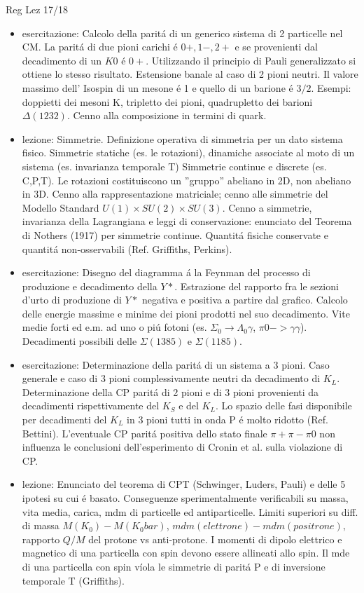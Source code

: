 \begin{frame}[allowframebreaks]{Reg Lez 17/18}
\begin{itemize}
\item esercitazione: Calcolo della parit\'a di un generico sistema di 2 particelle nel CM. La parit\'a di due pioni carichi \'e $0+,1-,2+$ e se provenienti dal decadimento di un $K0$ \'e $0+$. Utilizzando il principio di Pauli generalizzato si ottiene lo stesso risultato. Estensione banale al caso di 2 pioni neutri. Il valore massimo dell' Isospin di un mesone \'e 1 e quello di un barione \'e $3/2$. Esempi: doppietti dei mesoni K, tripletto dei pioni, quadrupletto dei barioni $\Delta(1232)$. Cenno alla composizione in termini di quark.

\item lezione: Simmetrie. Definizione operativa di simmetria per un dato sistema fisico. Simmetrie statiche (es. le rotazioni), dinamiche associate al moto di un sistema (es. invarianza temporale T) Simmetrie continue e discrete (es. C,P,T). Le rotazioni costituiscono un ''gruppo'' abeliano in 2D, non abeliano in 3D. Cenno alla rappresentazione matriciale; cenno alle simmetrie del Modello Standard $U(1)\times SU(2)\times SU(3)$. Cenno a simmetrie, invarianza della Lagrangiana e leggi di conservazione: enunciato del Teorema di N\:others (1917) per simmetrie continue. Quantit\'a fisiche conservate e quantit\'a non-osservabili (Ref. Griffiths, Perkins).

\item esercitazione: Disegno del diagramma \'a la Feynman del processo di produzione e decadimento della $Y*$. Estrazione del rapporto fra le sezioni d'urto di produzione di $Y*$ negativa e positiva a partire dal grafico. Calcolo delle energie massime e minime dei pioni prodotti nel suo decadimento. Vite medie forti ed e.m. ad uno o pi\'u fotoni (es. $\Sigma_0\to\Lambda_0 \gamma$, $\pi0->\gamma \gamma$). Decadimenti possibili delle $\Sigma(1385)$ e $\Sigma(1185)$.

\item esercitazione: Determinazione della parit\'a di un sistema a 3 pioni. Caso generale e caso di 3 pioni complessivamente neutri da decadimento di $K_L$. Determinazione della CP parit\'a di 2 pioni e di 3 pioni provenienti da decadimenti rispettivamente del $K_S$ e del $K_L$. Lo spazio delle fasi disponibile per decadimenti del $K_L$ in 3 pioni tutti in onda P \'e molto ridotto (Ref. Bettini). L'eventuale CP parit\'a positiva dello stato finale $\pi+\pi-\pi0$ non influenza le conclusioni dell'esperimento di Cronin et al. sulla violazione di CP.

\item  lezione: Enunciato del teorema di CPT (Schwinger, L\:uders, Pauli) e delle 5 ipotesi su cui \'e basato. Conseguenze sperimentalmente verificabili su massa, vita media, carica, mdm di particelle ed antiparticelle. Limiti superiori su diff. di massa $M(K_0)-M(K_0bar)$, $mdm(elettrone)-mdm(positrone),$ rapporto $Q/M$ del protone vs anti-protone. I momenti di dipolo elettrico e magnetico di una particella con spin devono essere allineati allo spin. Il mde di una particella con spin v\'iola le simmetrie di parit\'a P e di inversione temporale T (Griffiths).


\end{itemize}
\end{frame}
